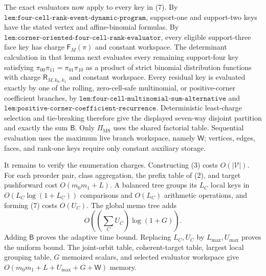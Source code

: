 The exact evaluators now apply to every key in (7). By \(\texttt{lem:four-cell-rank-event-dynamic-program}\), support-one and support-two keys have the stated vertex and affine-binomial formulas. By \(\texttt{lem:corner-oriented-four-cell-rank-evaluator}\), every eligible support-three face key has charge \(\mathsf F_M(\pi)\) and constant workspace. The determinant calculation in that lemma next evaluates every remaining support-four key satisfying \(\pi_{00}\pi_{11}=\pi_{01}\pi_{10}\) as a product of strict binomial distribution functions with charge \(\mathsf R_{M,k_0,k_1}\) and constant workspace. Every residual key is evaluated exactly by one of the rolling, zero-cell-safe multinomial, or positive-corner coefficient branches, by \(\texttt{lem:four-cell-multinomial-sum-alternative}\) and \(\texttt{lem:positive-corner-coefficient-recurrence}\). Deterministic least-charge selection and tie-breaking therefore give the displayed seven-way disjoint partition and exactly the sum \(\mathsf B\). Only \(\Pi_{\mathrm{MS}}\) uses the shared factorial table. Sequential evaluation uses the maximum live branch workspace, namely \(\mathsf W\); vertices, edges, faces, and rank-one keys require only constant auxiliary storage.

It remains to verify the enumeration charges. Constructing (3) costs \(O(|\mathcal V|)\). For each preorder pair, class aggregation, the prefix table of (2), and target pushforward cost \(O(m_0m_1+L)\). A balanced tree groups its \(L_C\) local keys in \(O(L_C\log(1+L_C))\) comparisons and \(O(L_C)\) arithmetic operations, and forming (7) costs \(O(U_C)\). The global memo tree adds
\[
O\!\left(\left(\sum_CU_C\right)\log(1+G)\right).
\]
Adding \(\mathsf B\) proves the adaptive time bound. Replacing \(L_C,U_C\) by \(L_{\max},U_{\max}\) proves the uniform bound. The joint-orbit table, coherent-target table, largest local grouping table, \(G\) memoized scalars, and selected evaluator workspace give \(O(m_0m_1+L+U_{\max}+G+\mathsf W)\) memory.

